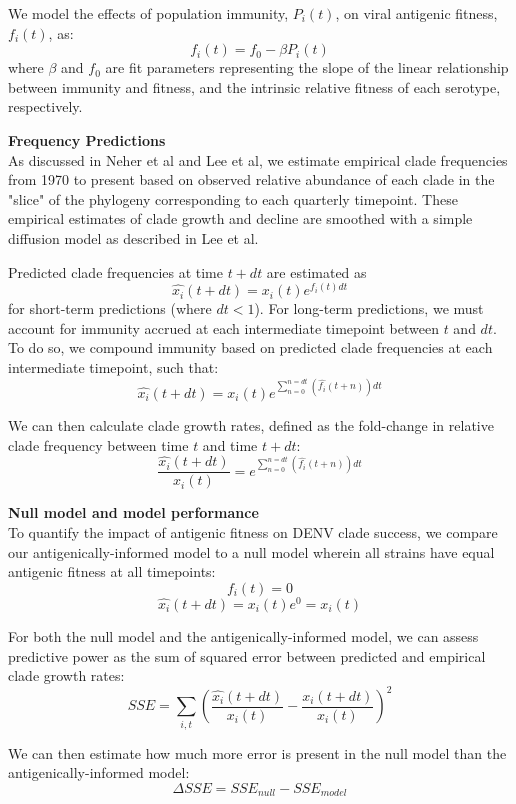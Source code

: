 \documentclass[11pt,oneside,letterpaper]{article}
\begin{document}
We model the effects of population immunity, $P_i(t)$, on viral antigenic fitness, $f_i(t)$, as:
$$f_i(t) = f_0-\beta P_i(t)$$
where $\beta$ and $f_0$ are fit parameters representing the slope of the linear relationship between immunity and fitness, and the intrinsic relative fitness of each serotype, respectively.

\textbf{Frequency Predictions}\\
As discussed in Neher et al and Lee et al, we estimate empirical clade frequencies from 1970 to present based on observed relative abundance of each clade in the "slice" of the phylogeny corresponding to each quarterly timepoint.
These empirical estimates of clade growth and decline are smoothed with a simple diffusion model as described in Lee et al.

Predicted clade frequencies at time $t + dt$ are estimated as
$$\hat{x_i}(t+dt) = x_i(t) e^{f_i(t) dt}$$
for short-term predictions (where $dt < 1$).
For long-term predictions, we must account for immunity accrued at each intermediate timepoint between $t$ and $dt$.
To do so, we compound immunity based on predicted clade frequencies at each intermediate timepoint, such that:
$$\hat{x_i}(t+dt) = x_i(t) e^{\sum_{n=0}^{n=dt}(\hat{f_i}(t+n))dt}$$

We can then calculate clade growth rates, defined as the fold-change in relative clade frequency between time $t$ and time $t+dt$:
$$\frac{\hat{x_i}(t+dt)}{x_i(t)} = e^{\sum_{n=0}^{n=dt}(\hat{f_i}(t+n))dt}$$

\textbf{Null model and model performance}\\
To quantify the impact of antigenic fitness on DENV clade success, we compare our antigenically-informed model to a null model wherein all strains have equal antigenic fitness at all timepoints:
$$f_i(t) = 0$$
$$\hat{x_i}(t+dt) = x_i(t) e^0 = x_i(t)$$

For both the null model and the antigenically-informed model, we can assess predictive power as the sum of squared error between predicted and empirical clade growth rates:
$$SSE = \sum_{i,t} (\frac{\hat{x_i}(t+dt)}{x_i(t)} - \frac{x_i(t+dt)}{x_i(t)})^2$$

We can then estimate how much more error is present in the null model than the antigenically-informed model:
$$\Delta SSE = SSE_{null} - SSE_{model}$$
\end{document}

